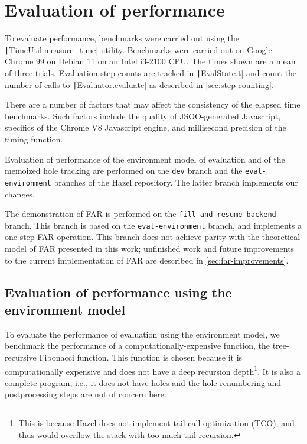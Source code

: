 \chapter{Evaluation of performance}
\label{sec:evaluation}

To evaluate performance, benchmarks were carried out using the \texttt|TimeUtil.measure_time| utility. Benchmarks were carried out on Google Chrome 99 on Debian 11 on an Intel i3-2100 CPU. The times shown are a mean of three trials. Evaluation step counts are tracked in \texttt|EvalState.t| and count the number of calls to \texttt|Evaluator.evaluate| as described in \cref{sec:step-counting}.

There are a number of factors that may affect the consistency of the elapsed time benchmarks. Such factors include the quality of JSOO-generated Javascript, specifics of the Chrome V8 Javascript engine, and millisecond precision of the timing function.

Evaluation of performance of the environment model of evaluation and of the memoized hole tracking are performed on the \texttt{dev} branch and the \texttt{eval-environment} branches of the Hazel repository. The latter branch implements our changes.

The demonstration of FAR is performed on the \texttt{fill-and-resume-backend} branch. This branch is based on the \texttt{eval-environment} branch, and implements a one-step FAR operation. This branch does not achieve parity with the theoretical model of FAR presented in this work; unfinished work and future improvements to the current implementation of FAR are described in \cref{sec:far-improvements}.

\section{Evaluation of performance using the environment model}
\label{sec:evaluation-evalenv}

To evaluate the performance of evaluation using the environment model, we benchmark the performance of a computationally-expensive function, the tree-recursive Fibonacci function. This function is chosen because it is computationally expensive and does not have a deep recursion depth\footnote{This is because Hazel does not implement tail-call optimization (TCO), and thus would overflow the stack with too much tail-recursion.}. It is also a complete program, i.e., it does not have holes and the hole renumbering and postprocessing steps are not of concern here.

